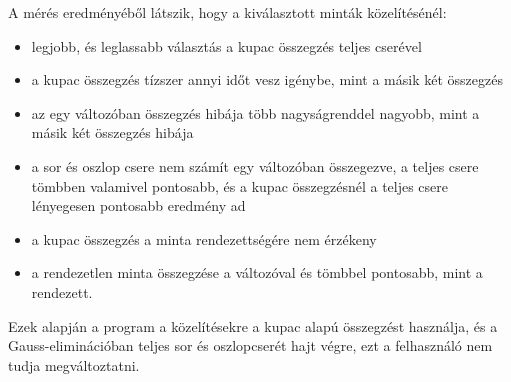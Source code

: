 A mérés eredményéből látszik, hogy a kiválasztott minták közelítésénél:
\begin{itemize}
\item legjobb, és leglassabb választás a kupac összegzés teljes cserével
\item a kupac összegzés tízszer annyi időt vesz igénybe, mint a másik két összegzés
\item az egy változóban összegzés hibája több nagyságrenddel nagyobb, mint a másik két összegzés hibája
\item a sor és oszlop csere nem számít egy változóban összegezve, a teljes csere tömbben valamivel pontosabb, és a kupac összegzésnél a teljes csere lényegesen pontosabb eredmény ad
\item a kupac összegzés a minta rendezettségére nem érzékeny
\item a rendezetlen minta összegzése a változóval és tömbbel pontosabb, mint a rendezett.
\end{itemize}
Ezek alapján a program a közelítésekre a kupac alapú összegzést használja, és a Gauss-eliminációban teljes sor és oszlopcserét hajt végre, ezt a felhasználó nem tudja megváltoztatni.
